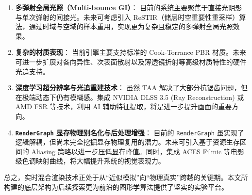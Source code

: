 \begin{enumerate}
    \item \textbf{多弹射全局光照（Multi-bounce GI）}：
    目前的系统主要聚焦于直接光阴影与单次弹射的间接光。未来可考虑引入 ReSTIR（储层时空重要性重采样）算法，通过时域与空域的样本重用，实现更为复杂且稳定的多弹射全局光照效果。
    
    \item \textbf{复杂的材质表现}：
    当前引擎主要支持标准的 Cook-Torrance PBR 材质。未来可进一步扩展对各向异性、次表面散射以及薄透镜折射等高级材质特性的硬件光追支持。
    
    \item \textbf{深度学习超分辨率与光追重建技术}：
    虽然 TAA 解决了大部分抗锯齿问题，但在极端动态下仍有模糊感。集成 NVIDIA DLSS 3.5 (Ray Reconstruction) 或 AMD FSR 等技术，利用 AI 辅助特征提取，将是进一步提升画面的重要方向。

    \item \textbf{\texttt{RenderGraph} 显存物理别名化与后处理增强}：
    目前的 \texttt{RenderGraph} 虽实现了逻辑解耦，但尚未完全挖掘显存物理复用的潜力。未来可引入基于资源生存区间的 Aliasing 策略以进一步压低显存峰值。同时，集成 ACES Filmic 等电影级色调映射曲线，将大幅提升系统的视觉表现力。

\end{enumerate}

总之，实时混合渲染技术正处于从“近似模拟”向“物理真实”跨越的关键期。本文所构建的底层架构为后续探索更为前沿的图形学算法提供了坚实的实验平台。
